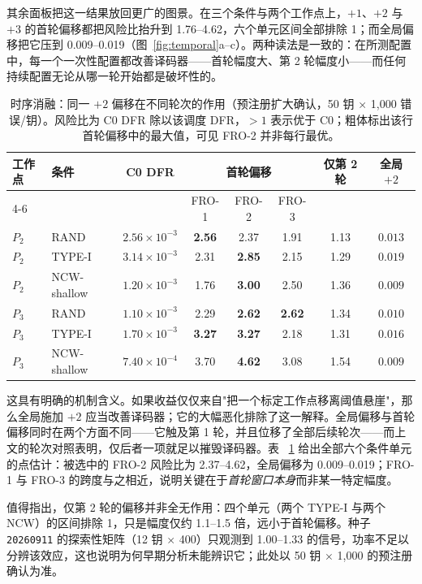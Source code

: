 \documentclass[UTF8,a4paper,10pt,twocolumn]{ctexart}
\begin{document}
其余面板把这一结果放回更广的图景。在三个条件与两个工作点上，$+1$、$+2$ 与 $+3$ 的首轮偏移都把风险比抬升到 1.76--4.62，六个单元区间全部排除 1；而全局偏移把它压到 0.009--0.019（图~\ref{fig:temporal}a--c）。两种读法是一致的：在所测配置中，每一个一次性配置都改善译码器——首轮幅度大、第 2 轮幅度小——而任何持续配置无论从哪一轮开始都是破坏性的。

\begin{table}[t]
\centering
\caption{时序消融：同一 $+2$ 偏移在不同轮次的作用（预注册扩大确认，50 钥 $\times$ 1{,}000 错误/钥）。风险比为 C0 DFR 除以该调度 DFR，$>1$ 表示优于 C0；粗体标出该行首轮偏移中的最大值，可见 FRO-2 并非每行最优。}
\label{tab:temporal}
\begin{tabular}{@{}llcccccc@{}}
\toprule
\multirow{2}{*}{工作点} & \multirow{2}{*}{条件} & \multirow{2}{*}{C0 DFR}
 & \multicolumn{3}{c}{首轮偏移} & \multirow{2}{*}{仅第 2 轮} & \multirow{2}{*}{全局 $+2$} \\
\cmidrule(lr){4-6}
 & & & FRO-1 & FRO-2 & FRO-3 & & \\
\midrule
$P_2$ & RAND        & $2.56\times10^{-3}$ & \textbf{2.56} & 2.37 & 1.91 & 1.13 & $0.013$ \\
$P_2$ & TYPE-I      & $3.14\times10^{-3}$ & 2.31 & \textbf{2.85} & 2.15 & 1.29 & $0.019$ \\
$P_2$ & NCW-shallow & $1.20\times10^{-3}$ & 1.76 & \textbf{3.00} & 2.50 & 1.36 & $0.009$ \\
$P_3$ & RAND        & $1.10\times10^{-3}$ & 2.29 & \textbf{2.62} & \textbf{2.62} & 1.34 & $0.010$ \\
$P_3$ & TYPE-I      & $1.70\times10^{-3}$ & \textbf{3.27} & \textbf{3.27} & 2.18 & 1.31 & $0.016$ \\
$P_3$ & NCW-shallow & $7.40\times10^{-4}$ & 3.70 & \textbf{4.62} & 3.08 & 1.54 & $0.009$ \\
\bottomrule
\end{tabular}
\end{table}

这具有明确的机制含义。如果收益仅仅来自"把一个标定工作点移离阈值悬崖"，那么全局施加 $+2$ 应当改善译码器；它的大幅恶化排除了这一解释。全局偏移与首轮偏移同时在两个方面不同——它触及第 1 轮，并且位移了全部后续轮次——而上文的轮次对照表明，仅后者一项就足以摧毁译码器。表~
\ref{tab:temporal} 给出全部六个条件单元的点估计：被选中的 FRO-2 风险比为 2.37--4.62，全局偏移为 0.009--0.019；FRO-1 与 FRO-3 的跨度与之相近，说明关键在于\emph{首轮窗口本身}而非某一特定幅度。

值得指出，仅第 2 轮的偏移并非全无作用：四个单元（两个 TYPE-I 与两个 NCW）的区间排除 1，只是幅度仅约 1.1--1.5 倍，远小于首轮偏移。种子 \texttt{20260911} 的探索性矩阵（12 钥 $\times$ 400）只观测到 1.00--1.33 的信号，功率不足以分辨该效应，这也说明为何早期分析未能辨识它；此处以 50 钥 $\times$ 1{,}000 的预注册确认为准。
\end{document}
